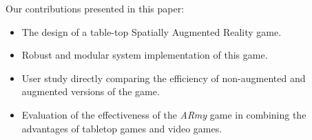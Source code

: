 \documentclass[review]{vgtc}                 %
\begin{document}
\vspace{0.1in}
\noindent
Our contributions presented in this paper:\vspace{-0.1in}

\begin{itemize}

\item The design of a table-top Spatially Augmented
  Reality game.\vspace{-0.1in}
  
\item Robust and modular system implementation of this game.\vspace{-0.1in}

\item User study directly comparing the efficiency of non-augmented
  and augmented versions of the game.\vspace{-0.1in}

\item Evaluation of the effectiveness of the \emph{ARmy} game in
  combining the advantages of tabletop games and video
  games.\vspace{-0.1in}


\end{itemize}

\end{document}
